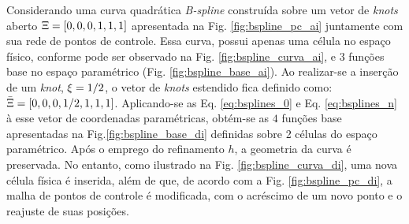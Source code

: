 \documentclass[tese_patricia]{subfiles}
\begin{document}
Considerando uma curva quadrática \textit{B-spline} construída sobre um vetor de \textit{knots} aberto $\Xi=[0,0,0,1,1,1]$ apresentada na Fig. \ref{fig:bspline_pc_ai} juntamente com sua rede de pontos de controle. Essa curva, possui apenas uma célula no espaço físico, conforme pode ser observado na Fig. \ref{fig:bspline_curva_ai}, e $3$ funções base no espaço paramétrico (Fig. \ref{fig:bspline_base_ai}). Ao realizar-se a inserção de um \textit{knot}, $\xi=1/2$, o vetor de \textit{knots} estendido fica definido como: $\bar{\Xi}=[0,0,0,1/2,1,1,1]$. Aplicando-se as Eq. \ref{eq:bsplines_0} e Eq. \ref{eq:bsplines_n} à esse vetor de coordenadas paramétricas, obtém-se as $4$ funções base apresentadas na Fig.\ref{fig:bspline_base_di} definidas sobre 2 células do espaço paramétrico. Após o emprego do refinamento $h$, a geometria da curva é preservada. No entanto, como ilustrado na Fig. \ref{fig:bspline_curva_di}, uma nova célula física é inserida, além de que, de acordo com a Fig. \ref{fig:bspline_pc_di}, a malha de pontos de controle é modificada, com o acréscimo de um novo ponto e o reajuste de suas posições.
\end{document}
